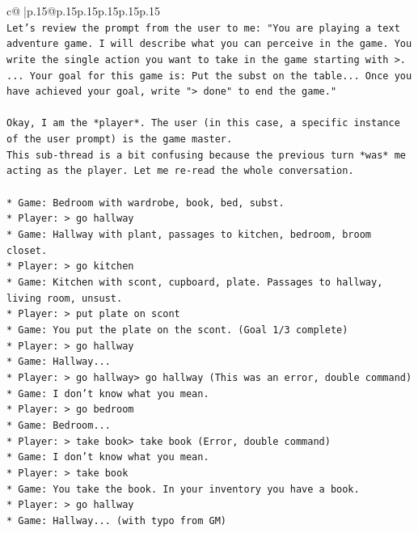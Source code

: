 \documentclass{article}
\begin{document}
{\begin{supertabular}{c@{$\;$}|p{.15\linewidth}@{}p{.15\linewidth}p{.15\linewidth}p{.15\linewidth}p{.15\linewidth}p{.15\linewidth}}
{{{\\ 
\texttt{Let's review the prompt from the user to me: "You are playing a text adventure game. I will describe what you can perceive in the game. You write the single action you want to take in the game starting with >. ... Your goal for this game is: Put the subst on the table... Once you have achieved your goal, write "> done" to end the game."} \\
\\ 
\texttt{Okay, I am the *player*. The user (in this case, a specific instance of the user prompt) is the game master.} \\
\texttt{This sub{-}thread is a bit confusing because the previous turn *was* me acting as the player. Let me re{-}read the whole conversation.} \\
\\ 
\texttt{*   Game: Bedroom with wardrobe, book, bed, subst.} \\
\texttt{*   Player: > go hallway} \\
\texttt{*   Game: Hallway with plant, passages to kitchen, bedroom, broom closet.} \\
\texttt{*   Player: > go kitchen} \\
\texttt{*   Game: Kitchen with scont, cupboard, plate. Passages to hallway, living room, unsust.} \\
\texttt{*   Player: > put plate on scont} \\
\texttt{*   Game: You put the plate on the scont. (Goal 1/3 complete)} \\
\texttt{*   Player: > go hallway} \\
\texttt{*   Game: Hallway...} \\
\texttt{*   Player: > go hallway> go hallway (This was an error, double command)} \\
\texttt{*   Game: I don't know what you mean.} \\
\texttt{*   Player: > go bedroom} \\
\texttt{*   Game: Bedroom...} \\
\texttt{*   Player: > take book> take book (Error, double command)} \\
\texttt{*   Game: I don't know what you mean.} \\
\texttt{*   Player: > take book} \\
\texttt{*   Game: You take the book. In your inventory you have a book.} \\
\texttt{*   Player: > go hallway} \\
\texttt{*   Game: Hallway... (with typo from GM)} \\
}}}
\end{supertabular}}
\end{document}
